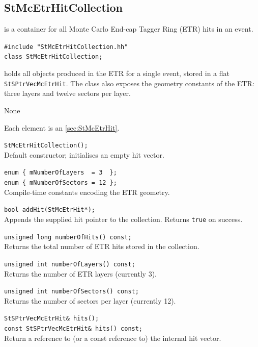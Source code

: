 \subsection{StMcEtrHitCollection}
 
\label{sec:StMcEtrHitCollection}
\begin{Entry}
\item[Summary]
     is a container for all Monte Carlo
    End-cap Tagger Ring (ETR) hits in an event.

\item[Synopsis]
    \verb+#include "StMcEtrHitCollection.hh"+\\
    \verb+class StMcEtrHitCollection;+\\

\item[Description]
     holds all  objects produced
    in the ETR for a single event, stored in a flat
    \verb+StSPtrVecMcEtrHit+.  The class also exposes the geometry
    constants of the ETR: three layers and twelve sectors per layer.

\item[Persistence]
    None

\item[Related Classes]
    Each element is an  \ref{sec:StMcEtrHit}.

\item[Public\\ Constructors]
    \verb+StMcEtrHitCollection();+\\
    Default constructor; initialises an empty hit vector.

\item[Enumerations]
    \verb+enum { mNumberOfLayers  = 3  };+\\
    \verb+enum { mNumberOfSectors = 12 };+\\
    Compile-time constants encoding the ETR geometry.

\item[Public Member\\ Functions]
    \verb+bool addHit(StMcEtrHit*);+\\
    Appends the supplied hit pointer to the collection.
    Returns \verb+true+ on success.

    \verb+unsigned long numberOfHits() const;+\\
    Returns the total number of ETR hits stored in the collection.

    \verb+unsigned int numberOfLayers() const;+\\
    Returns the number of ETR layers (currently 3).

    \verb+unsigned int numberOfSectors() const;+\\
    Returns the number of sectors per layer (currently 12).

    \verb+StSPtrVecMcEtrHit& hits();+\\
    \verb+const StSPtrVecMcEtrHit& hits() const;+\\
    Return a reference to (or a const reference to) the internal hit vector.

\end{Entry}
